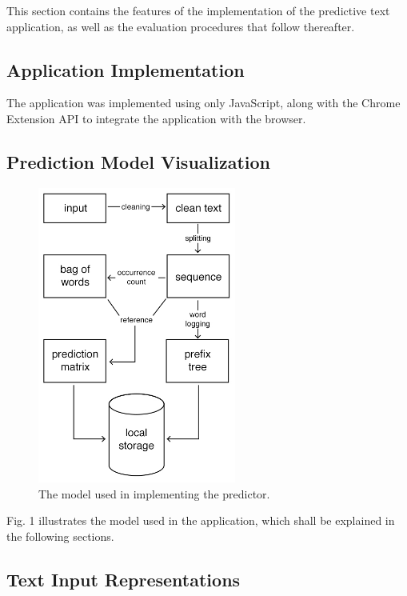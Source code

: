 \documentclass[journal]{./IEEE/IEEEtran}
\begin{document}


This section contains the features of the implementation of the predictive text application, as well as the evaluation procedures that follow thereafter.

\subsection{Application Implementation}
The application was implemented using only JavaScript, along with the Chrome Extension API to integrate the application with the browser.

\subsection{Prediction Model Visualization}

\begin{figure}[!ht]
\begin{center}

\includegraphics[width=65mm]{images/model.jpg}
\caption{The model used in implementing the predictor.}

\end{center}
\end{figure}

Fig. 1 illustrates the model used in the application, which shall be explained in the following sections.

\subsection{Text Input Representations}
\end{document}
